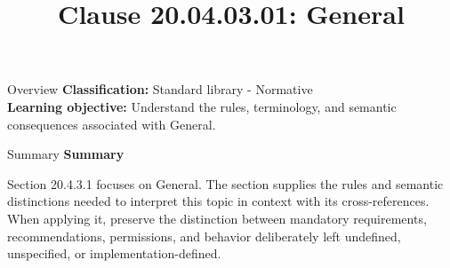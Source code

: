 \documentclass[10pt,letterpaper]{article}
\title{Clause 20.04.03.01: General}
\author{}
\date{}
\begin{document}
\maketitle
\begin{CornellOverviewBox}{Overview}
\textbf{Classification:} Standard library - Normative\\[2pt]
\textbf{Learning objective:} Understand the rules, terminology, and semantic consequences associated with General.
\end{CornellOverviewBox}\begin{CornellSummaryBox}{Summary}
{\sffamily\bfseries\color{Accent} Summary}\par\vspace{3pt}Section 20.4.3.1 focuses on General. The section supplies the rules and semantic distinctions needed to interpret this topic in context with its cross-references. When applying it, preserve the distinction between mandatory requirements, recommendations, permissions, and behavior deliberately left undefined, unspecified, or implementation-defined.
\end{CornellSummaryBox}
\end{document}
